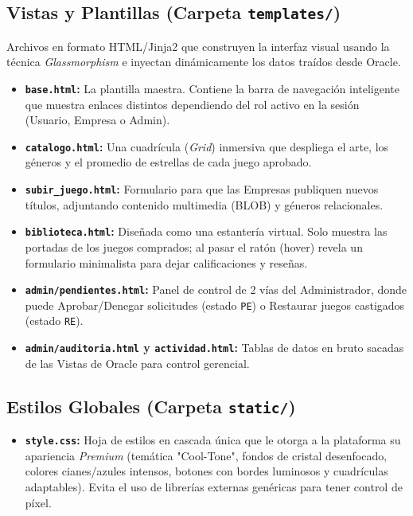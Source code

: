 \documentclass[12pt,a4paper]{article}
\begin{document}
\subsection{Vistas y Plantillas (Carpeta \texttt{templates/})}
Archivos en formato HTML/Jinja2 que construyen la interfaz visual usando la técnica \textit{Glassmorphism} e inyectan dinámicamente los datos traídos desde Oracle.
\begin{itemize}
    \item \textbf{\texttt{base.html}:} La plantilla maestra. Contiene la barra de navegación inteligente que muestra enlaces distintos dependiendo del rol activo en la sesión (Usuario, Empresa o Admin).
    \item \textbf{\texttt{catalogo.html}:} Una cuadrícula (\textit{Grid}) inmersiva que despliega el arte, los géneros y el promedio de estrellas de cada juego aprobado.
    \item \textbf{\texttt{subir\_juego.html}:} Formulario para que las Empresas publiquen nuevos títulos, adjuntando contenido multimedia (BLOB) y géneros relacionales.
    \item \textbf{\texttt{biblioteca.html}:} Diseñada como una estantería virtual. Solo muestra las portadas de los juegos comprados; al pasar el ratón (hover) revela un formulario minimalista para dejar calificaciones y reseñas.
    \item \textbf{\texttt{admin/pendientes.html}:} Panel de control de 2 vías del Administrador, donde puede Aprobar/Denegar solicitudes (estado \texttt{PE}) o Restaurar juegos castigados (estado \texttt{RE}).
    \item \textbf{\texttt{admin/auditoria.html} y \texttt{actividad.html}:} Tablas de datos en bruto sacadas de las Vistas de Oracle para control gerencial.
\end{itemize}

\subsection{Estilos Globales (Carpeta \texttt{static/})}
\begin{itemize}
    \item \textbf{\texttt{style.css}:} Hoja de estilos en cascada única que le otorga a la plataforma su apariencia \textit{Premium} (temática "Cool-Tone", fondos de cristal desenfocado, colores cianes/azules intensos, botones con bordes luminosos y cuadrículas adaptables). Evita el uso de librerías externas genéricas para tener control de píxel.
\end{itemize}
\end{document}

